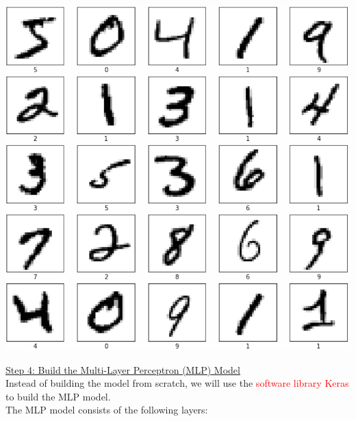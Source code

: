 \documentclass{book}
\begin{document}
\begin{center}
    \includegraphics[scale=0.2]{chapter 7/ch7_figure15.jpeg}
\end{center}
\newpage
\uline{Step 4: Build the Multi-Layer Perceptron (MLP) Model}\\
\vspace{1mm}
Instead of building the model from scratch, we will use the \textcolor{red}{software library Keras} to build the MLP model.\\
The MLP model consists of the following layers:
\end{document}
